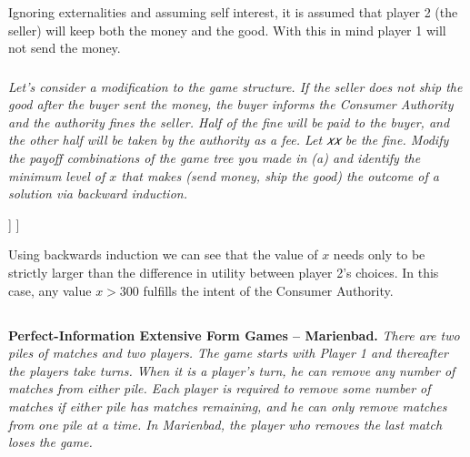 \documentclass[12pt]{amsart}
\begin{document}
	Ignoring externalities and assuming self interest, 
	it is assumed that player 2 (the seller) will keep both the money and the good. 
	With this in mind player 1 will not send the money.\\

\subsubsection{}
\textit{Let’s consider a modification to the game structure. If the seller does not ship the good
	after the buyer sent the money, the buyer informs the Consumer Authority and the
	authority fines the seller. Half of the fine will be paid to the buyer, and the other half
	will be taken by the authority as a fee. Let 𝑥𝑥 be the fine. Modify the payoff
	combinations of the game tree you made in (a) and identify the minimum level of $x$ that
	makes (send money, ship the good) the outcome of a solution via backward
	induction.} \\
	
	\begin{center}
		\begin{forest}
			[\textcolor{white}{1}, circle, fill=ForestGreen, draw, font={\bfseries\large}
				[{(500,300)}, edge label={node[midway,left,font=\scriptsize]{Do Not Send Money}} ]
					[\textcolor{white}{2}, edge label={node[midway,right,font=\scriptsize]{Send Money}}, 
				circle, draw, fill=Maroon, font={\bfseries\large} 
					[{($x/2$,800-$x$)}, edge label={node[midway,left,font=\scriptsize]{Do Not Ship Good}} ]
					[{(1000,500)}, edge label={node[midway,right,font=\scriptsize]{Ship Good}} ]
				]
			]
		\end{forest}
	\end{center}
	
	Using backwards induction we can see that the value of $x$ needs only to be strictly larger than the difference in 
	utility between player 2's choices. In this case, any value $x>300$ fulfills the intent of the Consumer Authority.


\clearpage
\subsection{}
\textbf{Perfect-Information Extensive Form Games – Marienbad.}\textit{ There are two piles of matches
	and two players. The game starts with Player 1 and thereafter the players take turns.
	When it is a player’s turn, he can remove any number of matches from either pile. Each
	player is required to remove some number of matches if either pile has matches remaining,
	and he can only remove matches from one pile at a time. In Marienbad, the player who
	removes the last match loses the game.}
\end{document}
